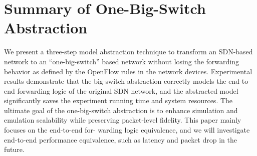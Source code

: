 \section{Summary of One-Big-Switch Abstraction}
\label{OBS:Sec:Conclusion}

We present a three-step model abstraction technique to transform an SDN-based network to
an ``one-big-switch'' based network without losing the forwarding behavior as
defined by the OpenFlow rules in the network devices.
Experimental results demonstrate that the big-switch abstraction correctly models
the end-to-end forwarding logic of the original SDN network,
and the abstracted model significantly saves the experiment running time and system resources.
The ultimate goal of the one-big-switch abstraction is to enhance simulation and emulation scalability while preserving packet-level fidelity.
This paper mainly focuses on the end-to-end for- warding logic equivalence,
and we will investigate end-to-end performance equivalence, such as latency and packet drop in the future.

